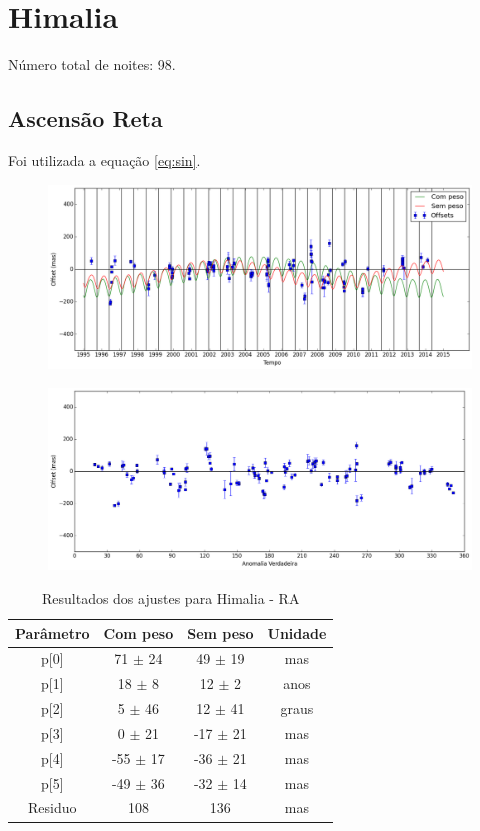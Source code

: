 \documentclass[11pt,a4paper]{report}
\begin{document}
\chapter*{Himalia}

\indent \indent Número total de noites: 98.

\section*{Ascensão Reta}

Foi utilizada a equação \ref{eq:sin}.

\begin{figure}[h]
\includegraphics[scale=0.45]{Himalia/RA.png} 
\end{figure}

\begin{figure}[h]
\includegraphics[scale=0.45]{Himalia/RA_anom.png}  
\end{figure}

\begin{table}[h!]
\caption{\label{Tab: Himalia-RA} Resultados dos ajustes para Himalia - RA}
\begin{centering}
\begin{tabular}{cccc}
\hline
\hline
Parâmetro & Com peso & Sem peso & Unidade\tabularnewline
\hline
p[0] & 71 $\pm$ 24 & 49 $\pm$ 19 & mas\\
p[1] & 18 $\pm$ 8 & 12 $\pm$ 2 & anos\\
p[2] & 5 $\pm$ 46 & 12 $\pm$ 41 & graus\\
p[3] & 0 $\pm$ 21 & -17 $\pm$ 21 & mas\\
p[4] & -55 $\pm$ 17 & -36 $\pm$ 21 & mas\\
p[5] & -49 $\pm$ 36 & -32 $\pm$ 14 & mas\\
Residuo & 108 & 136 & mas\\
\hline 
\end{tabular} 
\par\end{centering}
\end{table}
\end{document}
